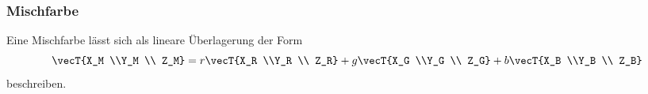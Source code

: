 \subsubsection{Mischfarbe}
Eine Mischfarbe lässt sich als lineare Überlagerung der Form
\begin{equation}
	\vecT{X_M \\Y_M \\ Z_M} = r \vecT{X_R \\Y_R \\ Z_R} + g\vecT{X_G \\Y_G \\ Z_G} + b \vecT{X_B \\Y_B \\ Z_B}
\end{equation}
beschreiben.